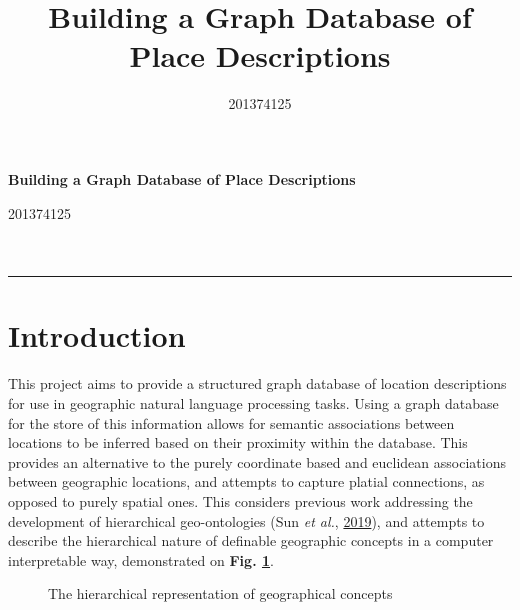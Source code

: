 \documentclass[10pt,]{article}
\title{Building a Graph Database of Place Descriptions}
\author{201374125}
\date{}
\newcommand{\blankline}{\quad\pagebreak[2]}
\begin{document}
  



\thispagestyle{plain} 

\begin{flushleft}\Large \bf Building a Graph Database of Place
Descriptions  \end{flushleft}
	\vspace{1 mm}   
201374125 \\
\emph{} \\
    \\

  

\hrule

\vspace{6 mm}
	


\hypertarget{introduction}{%
\section{Introduction}\label{introduction}}

This project aims to provide a structured graph database of location
descriptions for use in geographic natural language processing tasks.
Using a graph database for the store of this information allows for
semantic associations between locations to be inferred based on their
proximity within the database. This provides an alternative to the
purely coordinate based and euclidean associations between geographic
locations, and attempts to capture platial connections, as opposed to
purely spatial ones. This considers previous work addressing the
development of hierarchical geo-ontologies (Sun \emph{et al.},
\protect\hyperlink{ref-sun2019a}{2019}), and attempts to describe the
hierarchical nature of definable geographic concepts in a computer
interpretable way, demonstrated on \textbf{Fig. \ref{f:hier}}.

\begin{figure}[H]
\begin{center}
\end{center}
\caption{The hierarchical representation of geographical concepts}\label{f:hier}
\end{figure}
\end{document}
